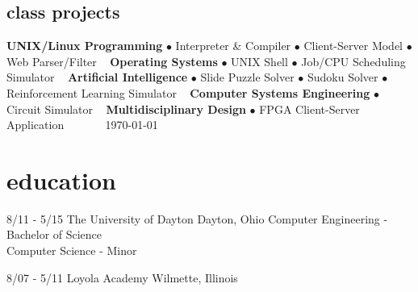 \documentclass[print]{resume}
\begin{document}
\begin{aside}
\section{class projects} 
\textbf{UNIX/Linux Programming}
$\bullet$ Interpreter \& Compiler
$\bullet$ Client-Server Model
$\bullet$ Web Parser/Filter
~
\textbf{Operating Systems}
$\bullet$ UNIX Shell
$\bullet$ Job/CPU Scheduling Simulator
~
\textbf{Artificial Intelligence}
$\bullet$ Slide Puzzle Solver
$\bullet$ Sudoku Solver 
$\bullet$ Reinforcement Learning Simulator
~
\textbf{Computer Systems Engineering}
$\bullet$ Circuit Simulator
~
\textbf{Multidisciplinary Design}
$\bullet$ FPGA Client-Server Application
~
~
~
~
\today
\end{aside}

\section{education}
\begin{entrylist}

\entry
{8/11 - 5/15}
{The University of Dayton}
{Dayton, Ohio}		
{
Computer Engineering - Bachelor of Science\\Computer Science - Minor
}

\entry
{8/07 - 5/11}
{Loyola Academy}
{Wilmette, Illinois}
{}

\end{entrylist}
\end{document}

